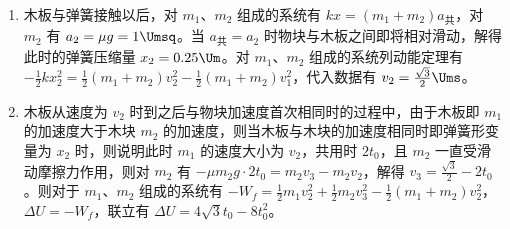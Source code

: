 \documentclass[\gkver]{gaokaozhenti}
\begin{document}
\begin{enumerate}
{\begin{enumerate}
	\item
	木板与弹簧接触以后，对 $m_{1}$、$m_{2}$ 组成的系统有 $kx=(m_{1}+m_{2})a_{\text{共}}$，对 $m_{2}$ 有 $a_{2}=\mu g=1\Umsq$。当 $a_{\text{共}}=a_{2}$ 时物块与木板之间即将相对滑动，解得此时的弹簧压缩量 $x_{2}=0.25\Um$。对 $m_{1}$、$m_{2}$ 组成的系统列动能定理有 $-\frac{1}{2}kx_{2}^{2}=\frac{1}{2}(m_{1}+m_{2})v_{2}^{2}-\frac{1}{2}(m_{1}+m_{2})v_{1}^{2}$，代入数据有 $v_{2}=\frac{\sqrt{3}}{2}\Ums$。
	\item
	木板从速度为 $v_{2}$ 时到之后与物块加速度首次相同时的过程中，由于木板即 $m_{1}$ 的加速度大于木块 $m_{2}$ 的加速度，则当木板与木块的加速度相同时即弹簧形变量为 $x_{2}$ 时，则说明此时 $m_{1}$ 的速度大小为 $v_{2}$，共用时 $2t_{0}$，且 $m_{2}$ 一直受滑动摩擦力作用，则对 $m_{2}$ 有 $-\mu m_{2}g\cdot2t_{0}=m_{2}v_{3}-m_{2}v_{2}$，解得 $v_{3}=\frac{\sqrt{3}}{2}-2t_{0}$。则对于 $m_{1}$、$m_{2}$ 组成的系统有 $-W_{f}=\frac{1}{2}m_{1}v_{2}^{2}+\frac{1}{2}m_{2}v_{3}^{2}-\frac{1}{2}(m_{1}+m_{2})v_{2}^{2}$，$\Delta U = -W_{f}$，联立有 $\Delta U = 4\sqrt{3}t_{0}-8t_{0}^{2}$。
\end{enumerate}
}

\end{enumerate}
\end{document}
